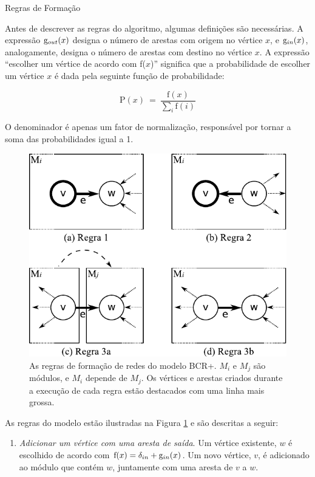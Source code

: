 \begin{section}{Regras de Formação}

Antes de descrever as regras do algoritmo, algumas definições são necessárias. A expressão $\mathrm{g}_{out}(x)$ designa o número de arestas com origem no vértice $x$, e $\mathrm{g}_{in}(x)$, analogamente, designa o número de arestas com destino no vértice $x$. A expressão ``escolher um vértice de acordo com f($x$)'' significa que a probabilidade de escolher um vértice $x$ é dada pela seguinte função de probabilidade:

$$
  \mathrm{P}(x) ~=~ \frac{ \mathrm{f}(x) }
  { \displaystyle\sum_{i} \mathrm{f}(i) }
$$

O denominador é apenas um fator de normalização, responsável por tornar a soma das probabilidades igual a 1.

\begin{figure}[htbp]
	\centering
		\includegraphics[scale=1]{figuras/regras-bcr}
	\caption{As regras de formação de redes do modelo BCR+. $M_i$ e $M_j$ são módulos, e $M_i$ depende de $M_j$. Os vértices e arestas criados durante a execução de cada regra estão destacados com uma linha mais grossa.}
	\label{fig:bcr-regras}
\end{figure}

As regras do modelo estão ilustradas na Figura \ref{fig:bcr-regras} e são descritas a seguir:

\begin{enumerate}

\item \emph{Adicionar um vértice com uma aresta de saída}. Um vértice existente, $w$ é escolhido de acordo com $\mathrm{f}(x) = \delta_{in} + \mathrm{g}_{in}(x)$. Um novo vértice, $v$, é adicionado ao módulo que contém $w$, juntamente com uma aresta de $v$ a $w$.


\end{enumerate}
\end{section}
